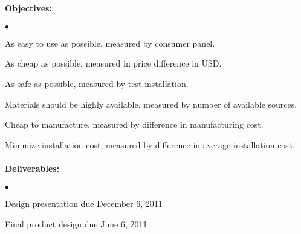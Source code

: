 \documentclass[11pt]{article}
\newcommand{\squishlist}{
 \begin{list}{$\bullet$}
  { \setlength{\itemsep}{0pt}
     \setlength{\parsep}{3pt}
     \setlength{\topsep}{3pt}
     \setlength{\partopsep}{0pt}
     \setlength{\leftmargin}{1.5em}
     \setlength{\labelwidth}{1em}
     \setlength{\labelsep}{0.5em} } }
\newcommand{\squishend}{
  \end{list}  }
\begin{document}
\paragraph{Objectives: }
\squishlist
\item As easy to use as possible, measured by consumer panel. \\[-0.4cm]
\item As cheap as possible, measured in price difference in USD. \\[-0.4cm]
\item As safe as possible, measured by test installation. \\[-0.4cm]
\item Materials should be highly available, measured by number of available sources.\\[-0.4cm]
\item Cheap to manufacture, measured by difference in manufacturing cost. \\[-0.4cm]
\item Minimize installation cost, measured by difference in average installation cost. \\[-0.4cm]
\squishend



\paragraph{Deliverables: }
\squishlist
\item Design presentation due December 6, 2011 \\[-0.4cm]
\item Final product design due June 6, 2011 \\[-0.4cm]
\squishend
\end{document}

